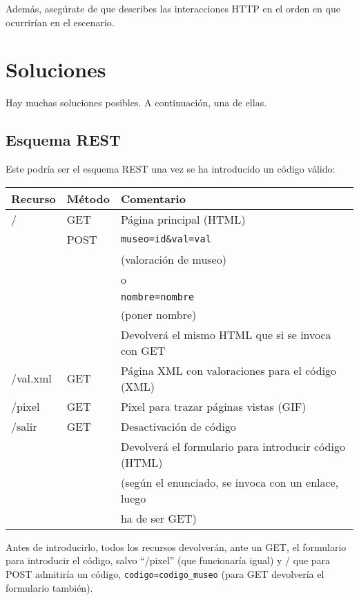 {Además, asegúrate de que describes las interacciones HTTP en el orden en que ocurrirían en el escenario.

\section*{Soluciones}

Hay muchas soluciones posibles. A continuación, una de ellas.

\subsection*{Esquema REST}

Este podría ser el esquema REST una vez se ha introducido un código válido:

\begin{tabular}{|l|l|l|}
  \hline
  Recurso & Método & Comentario \\ \hline \hline
  /       & GET    & Página principal (HTML) \\
          & POST   & \verb|museo=id&val=val| \\
          &        & (valoración de museo) \\
          &        & o \\
          &        & \verb|nombre=nombre| \\
          &        & (poner nombre) \\
          &        & Devolverá el mismo HTML que si se invoca con GET \\ \hline
  /val.xml & GET   & Página XML con valoraciones para el código (XML) \\ \hline
  /pixel  & GET    & Pixel para trazar páginas vistas (GIF) \\ \hline
  /salir  & GET    & Desactivación de código \\
          &        & Devolverá el formulario para introducir código (HTML) \\
          &        & (según el enunciado, se invoca con un enlace, luego \\
          &        & ha de ser GET) \\ \hline
\end{tabular}

Antes de introducirlo, todos los recursos devolverán, ante un GET, el formulario para introducir el código, salvo ``/pixel'' (que funcionaría igual) y / que para POST admitiría un código, \verb|codigo=codigo_museo| (para GET devolvería el formulario también).

}
